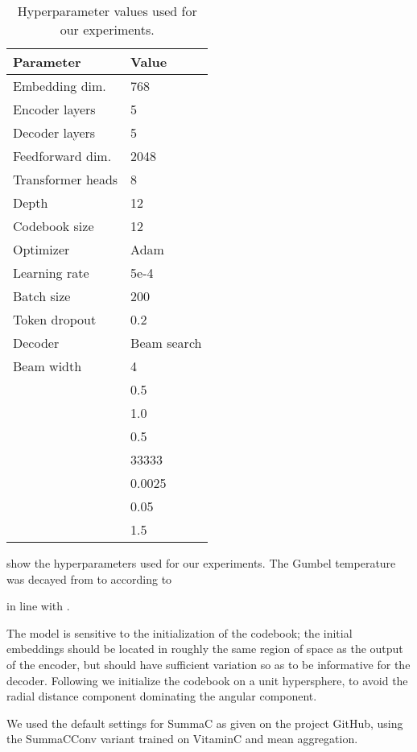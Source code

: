 \documentclass[11pt]{article}
\begin{document}
\begin{table}[ht]
    \centering
\begin{tabular}{l|p{4cm}}
    \textbf{Parameter} & \textbf{Value} \\
    \hline
    Embedding dim.  & 768 \\
    Encoder layers & 5 \\
    Decoder layers & 5 \\
    Feedforward dim. & 2048 \\
    Transformer heads & 8 \\
    Depth & 12 \\
    Codebook size & 12 \\
    Optimizer & Adam~\cite{adam} \\
    Learning rate & 5e-4 \\
    Batch size & 200 \\
    Token dropout & 0.2~\cite{tokendropout} \\
    Decoder & Beam search \\
    Beam width & 4 \\
     & 0.5 \\
     & 1.0 \\
     & 0.5 \\
     & 33333 \\
     & 0.0025 \\
     & 0.05 \\
     & 1.5 \\
    \end{tabular}
    \caption{Hyperparameter values used for our experiments.}
    \label{tab:hyperparams}
\end{table}

 show the hyperparameters used for our experiments. The Gumbel temperature was decayed from  to  according to 

in line with \citet{jang2016categorical}.

The model is sensitive to the initialization of the codebook; the initial embeddings should be located in roughly the same region of space as the output of the encoder, but should have sufficient variation so as to be informative for the decoder. Following \citet{9207145} we initialize the codebook on a unit hypersphere, to avoid the radial distance component dominating the angular component.

We used the default settings for SummaC \cite{laban-etal-2022-summac} as given on the project GitHub, using the SummaCConv variant trained on VitaminC \cite{schuster-etal-2021-get} and mean aggregation.
\end{document}
